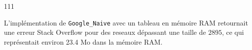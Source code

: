 \begin{dinglist}{111}
   \item L'implémentation de \lstinline{Google_Naive} avec un tableau en mémoire RAM retournait une erreur Stack Overflow pour des reseaux dépassant une taille de $2 895$, ce qui représentait environ 23.4 Mo dans la mémoire RAM.
\end{dinglist}